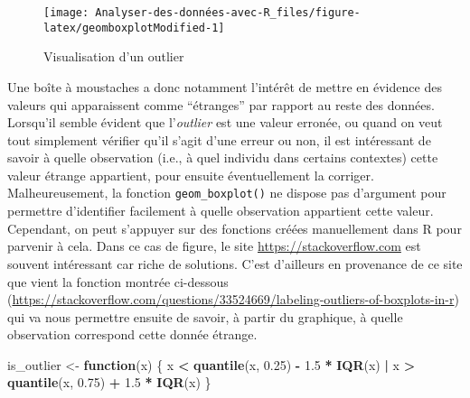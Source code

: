 \documentclass[
  french,
]{book}
\newenvironment{Shaded}{\begin{snugshade}}{\end{snugshade}}
\newcommand{\ControlFlowTok}[1]{\textcolor[rgb]{0.13,0.29,0.53}{\textbf{#1}}}
\newcommand{\FloatTok}[1]{\textcolor[rgb]{0.00,0.00,0.81}{#1}}
\newcommand{\KeywordTok}[1]{\textcolor[rgb]{0.13,0.29,0.53}{\textbf{#1}}}
\newcommand{\NormalTok}[1]{#1}
\newcommand{\OperatorTok}[1]{\textcolor[rgb]{0.81,0.36,0.00}{\textbf{#1}}}
\newcommand{\StringTok}[1]{\textcolor[rgb]{0.31,0.60,0.02}{#1}}
\begin{document}
\begin{figure}

{\centering \texttt{[image: Analyser-des-données-avec-R\_files/figure-latex/geomboxplotModified-1]} 

}

\caption{Visualisation d'un outlier}\label{fig:geomboxplotModified}
\end{figure}

Une boîte à moustaches a donc notamment l'intérêt de mettre en évidence des valeurs qui apparaissent comme ``étranges'' par rapport au reste des données. Lorsqu'il semble évident que l'\emph{outlier} est une valeur erronée, ou quand on veut tout simplement vérifier qu'il s'agit d'une erreur ou non, il est intéressant de savoir à quelle observation (i.e., à quel individu dans certains contextes) cette valeur étrange appartient, pour ensuite éventuellement la corriger. Malheureusement, la fonction \texttt{geom\_boxplot()} ne dispose pas d'argument pour permettre d'identifier facilement à quelle observation appartient cette valeur. Cependant, on peut s'appuyer sur des fonctions créées manuellement dans R pour parvenir à cela. Dans ce cas de figure, le site \url{https://stackoverflow.com} est souvent intéressant car riche de solutions. C'est d'ailleurs en provenance de ce site que vient la fonction montrée ci-dessous (\url{https://stackoverflow.com/questions/33524669/labeling-outliers-of-boxplots-in-r}) qui va nous permettre ensuite de savoir, à partir du graphique, à quelle observation correspond cette donnée étrange.

\begin{Shaded}
\begin{Highlighting}[]
\NormalTok{is_outlier <-}\StringTok{ }\ControlFlowTok{function}\NormalTok{(x) \{}
\NormalTok{  x }\OperatorTok{<}\StringTok{ }\KeywordTok{quantile}\NormalTok{(x, }\FloatTok{0.25}\NormalTok{) }\OperatorTok{-}\StringTok{ }\FloatTok{1.5} \OperatorTok{*}\StringTok{ }\KeywordTok{IQR}\NormalTok{(x) }\OperatorTok{|}\StringTok{ }\NormalTok{x }\OperatorTok{>}\StringTok{ }\KeywordTok{quantile}\NormalTok{(x, }\FloatTok{0.75}\NormalTok{) }\OperatorTok{+}\StringTok{ }\FloatTok{1.5} \OperatorTok{*}\StringTok{ }\KeywordTok{IQR}\NormalTok{(x)}
\NormalTok{\}}
\end{Highlighting}
\end{Shaded}
\end{document}
